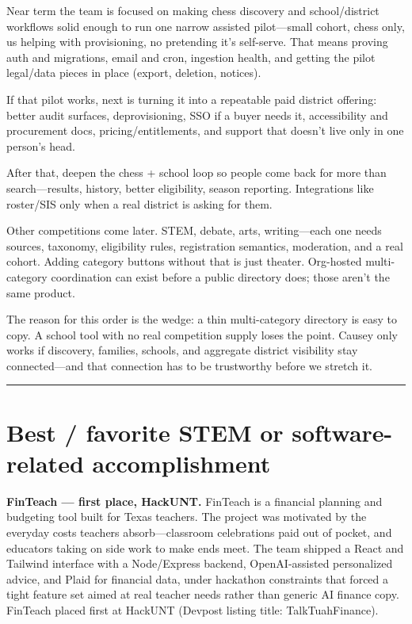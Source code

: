 \documentclass[11pt]{article}
\begin{document}
Near term the team is focused on making chess discovery and school/district workflows solid enough to run one narrow assisted pilot---small cohort, chess only, us helping with provisioning, no pretending it's self-serve. That means proving auth and migrations, email and cron, ingestion health, and getting the pilot legal/data pieces in place (export, deletion, notices).

If that pilot works, next is turning it into a repeatable paid district offering: better audit surfaces, deprovisioning, SSO if a buyer needs it, accessibility and procurement docs, pricing/entitlements, and support that doesn't live only in one person's head.

After that, deepen the chess + school loop so people come back for more than search---results, history, better eligibility, season reporting. Integrations like roster/SIS only when a real district is asking for them.

Other competitions come later. STEM, debate, arts, writing---each one needs sources, taxonomy, eligibility rules, registration semantics, moderation, and a real cohort. Adding category buttons without that is just theater. Org-hosted multi-category coordination can exist before a public directory does; those aren't the same product.

The reason for this order is the wedge: a thin multi-category directory is easy to copy. A school tool with no real competition supply loses the point. Causey only works if discovery, families, schools, and aggregate district visibility stay connected---and that connection has to be trustworthy before we stretch it.

\vspace{0.5em}
\hrule
\vspace{1em}

\section*{Best / favorite STEM or software-related accomplishment}

\textbf{FinTeach --- first place, HackUNT.}
FinTeach is a financial planning and budgeting tool built for Texas teachers. The project was motivated by the everyday costs teachers absorb---classroom celebrations paid out of pocket, and educators taking on side work to make ends meet. The team shipped a React and Tailwind interface with a Node/Express backend, OpenAI-assisted personalized advice, and Plaid for financial data, under hackathon constraints that forced a tight feature set aimed at real teacher needs rather than generic AI finance copy. FinTeach placed first at HackUNT (Devpost listing title: TalkTuahFinance).
\end{document}
